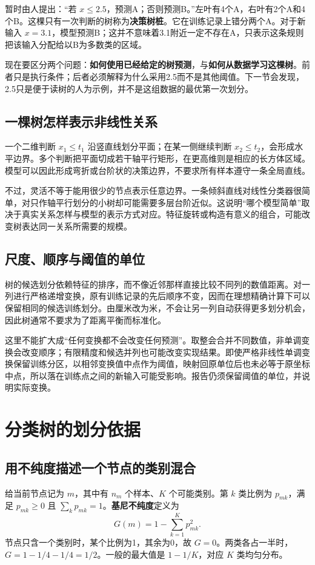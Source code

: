 暂时由人提出：“若 $x\leq2.5$，预测A；否则预测B。”左叶有4个A，右叶有2个A和4个B。这棵只有一次判断的树称为\textbf{决策树桩}。它在训练记录上错分两个A。对于新输入 $x=3.1$，模型预测B；这并不意味着3.1附近一定不存在A，只表示这条规则把该输入分配给以B为多数类的区域。

现在要区分两个问题：\textbf{如何使用已经给定的树预测}，与\textbf{如何从数据学习这棵树}。前者只是执行条件；后者必须解释为什么采用2.5而不是其他阈值。下一节会发现，2.5只是便于读树的人为示例，并不是这组数据的最优第一次划分。

\subsection{一棵树怎样表示非线性关系}
一个二维判断 $x_1\leq t_1$ 沿竖直线划分平面；在某一侧继续判断 $x_2\leq t_2$，会形成水平边界。多个判断把平面切成若干轴平行矩形，在更高维则是相应的长方体区域。模型可以因此形成弯折或台阶状的决策边界，不要求所有样本遵守一条全局直线。

不过，灵活不等于能用很少的节点表示任意边界。一条倾斜直线对线性分类器很简单，对只作轴平行划分的小树却可能需要多层台阶近似。这说明“哪个模型简单”取决于真实关系怎样与模型的表示方式对应。特征旋转或构造有意义的组合，可能改变树表达同一关系所需要的规模。

\subsection{尺度、顺序与阈值的单位}
树的候选划分依赖特征的排序，而不像近邻那样直接比较不同列的数值距离。对一列进行严格递增变换，原有训练记录的先后顺序不变，因而在理想精确计算下可以保留相同的候选训练划分。由厘米改为米，不会让另一列自动获得更多划分机会，因此树通常不要求为了距离平衡而标准化。

这里不能扩大成“任何变换都不会改变任何预测”。取整会合并不同数值，非单调变换会改变顺序；有限精度和候选并列也可能改变实现结果。即使严格非线性单调变换保留训练分区，以相邻变换值中点作为阈值，映射回原单位后也未必等于原坐标中点，所以落在训练点之间的新输入可能受影响。报告仍须保留阈值的单位，并说明实际变换。

\section{分类树的划分依据}
\subsection{用不纯度描述一个节点的类别混合}
给当前节点记为 $m$，其中有 $n_m$ 个样本、$K$ 个可能类别。第 $k$ 类比例为 $p_{mk}$，满足 $p_{mk}\geq0$ 且 $\sum_kp_{mk}=1$。\textbf{基尼不纯度}定义为
\begin{equation}
G(m)=1-\sum_{k=1}^{K}p_{mk}^{2}.
\label{eq:tree-gini}
\end{equation}
节点只含一个类别时，某个比例为1，其余为0，故 $G=0$。两类各占一半时，$G=1-1/4-1/4=1/2$。一般的最大值是 $1-1/K$，对应 $K$ 类均匀分布。

